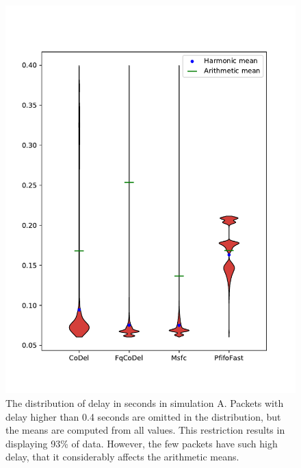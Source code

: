 \begin{figure}
	\centering
	\includegraphics[width=137mm]{drawings/overall-delay-down}
	\caption{The distribution of delay in seconds in simulation A. Packets with delay higher than 0.4 seconds are omitted in the distribution, but the means are computed from all values. This restriction results in displaying 93\% of data. However, the few packets have such high delay, that it considerably affects the arithmetic means. }
	\label{fig:overall_delay}
\end{figure}

